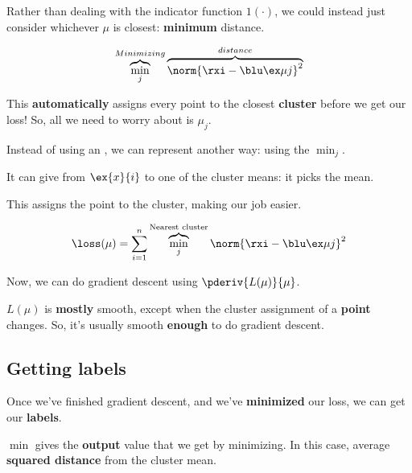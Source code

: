         Rather than dealing with the indicator function $1(\cdot)$, we could instead just consider whichever $\mu$ is closest: \textbf{minimum} distance.
        
        \begin{equation}
            \overbrace{
                \min_{j} 
            }^{Minimizing}
            \overbrace{
                \norm{ \rxi - \bmuj }^2 
            }^{distance}
        \end{equation}
        
        This \textbf{automatically} assigns every point to the closest \textbf{cluster} before we get our loss! So, all we need to worry about is $\mu_j$.
        
        \begin{notation}
            Instead of using an , we can represent  another way: using the  $\min_{j}$.
            
            It can give  from $\ex{x}{i}$ to one of the cluster means: it picks the  mean. 
            
            This  assigns the point to the  cluster, making our job easier.
        \end{notation}
        
        \begin{equation}
            \loss(\mu) =
            \sum_{i=1}^n 
            \overbrace{
                    \min_{j} 
            }^{\text{Nearest cluster}}
                    \norm{ \rxi - \bmuj }^2 
        \end{equation}
        
        Now, we can do gradient descent using $\pderiv{L(\mu)}{\mu}$. 
        
        $L(\mu)$ is \textbf{mostly} smooth, except when the cluster assignment of a \textbf{point} changes. So, it's usually smooth \textbf{enough} to do gradient descent.
    
    \subsection{Getting labels}
        
        Once we've finished gradient descent, and we've \textbf{minimized} our loss, we can get our \textbf{labels}.
        
        $\min$ gives the \textbf{output} value that we get by minimizing. In this case, average \textbf{squared distance} from the cluster mean.
        
